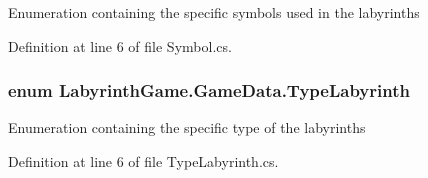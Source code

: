 Enumeration containing the specific symbols used in the labyrinths 



Definition at line 6 of file Symbol.\+cs.

\hypertarget{namespace_labyrinth_game_1_1_game_data_a911877be7f3c2eb330b648e52945476c}{
\subsubsection[{Type\+Labyrinth}]{\setlength{\rightskip}{0pt plus 5cm}enum {\bf Labyrinth\+Game.\+Game\+Data.\+Type\+Labyrinth}}}\label{namespace_labyrinth_game_1_1_game_data_a911877be7f3c2eb330b648e52945476c}


Enumeration containing the specific type of the labyrinths 



Definition at line 6 of file Type\+Labyrinth.\+cs.

